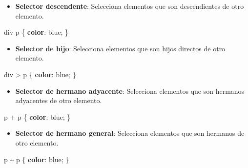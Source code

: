 \documentclass[
  a4paper,
  DIV=11,
  numbers=noendperiod,
  onepage,
  openany]{scrreprt}
\newenvironment{Shaded}{\begin{snugshade}}{\end{snugshade}}
\newcommand{\CharTok}[1]{\textcolor[rgb]{0.13,0.47,0.30}{#1}}
\newcommand{\ConstantTok}[1]{\textcolor[rgb]{0.56,0.35,0.01}{#1}}
\newcommand{\KeywordTok}[1]{\textcolor[rgb]{0.00,0.23,0.31}{\textbf{#1}}}
\newcommand{\NormalTok}[1]{\textcolor[rgb]{0.00,0.23,0.31}{#1}}
\newcommand{\OperatorTok}[1]{\textcolor[rgb]{0.37,0.37,0.37}{#1}}
\providecommand{\tightlist}{%
  \setlength{\itemsep}{0pt}\setlength{\parskip}{0pt}}\usepackage{longtable,booktabs,array}
\begin{document}
\begin{tcolorbox}
\begin{itemize}
\tightlist
\item
  \textbf{Selector descendente}: Selecciona elementos que son
  descendientes de otro elemento.
\end{itemize}

\begin{Shaded}
\begin{Highlighting}[]
\NormalTok{div p \{}
  \KeywordTok{color}\CharTok{:} \ConstantTok{blue}\OperatorTok{;}
\NormalTok{\}}
\end{Highlighting}
\end{Shaded}

\begin{itemize}
\tightlist
\item
  \textbf{Selector de hijo}: Selecciona elementos que son hijos directos
  de otro elemento.
\end{itemize}

\begin{Shaded}
\begin{Highlighting}[]
\NormalTok{div }\OperatorTok{\textgreater{}}\NormalTok{ p \{}
  \KeywordTok{color}\CharTok{:} \ConstantTok{blue}\OperatorTok{;}
\NormalTok{\}}
\end{Highlighting}
\end{Shaded}

\begin{itemize}
\tightlist
\item
  \textbf{Selector de hermano adyacente}: Selecciona elementos que son
  hermanos adyacentes de otro elemento.
\end{itemize}

\begin{Shaded}
\begin{Highlighting}[]
\NormalTok{p }\OperatorTok{+}\NormalTok{ p \{}
  \KeywordTok{color}\CharTok{:} \ConstantTok{blue}\OperatorTok{;}
\NormalTok{\}}
\end{Highlighting}
\end{Shaded}

\begin{itemize}
\tightlist
\item
  \textbf{Selector de hermano general}: Selecciona elementos que son
  hermanos de otro elemento.
\end{itemize}

\begin{Shaded}
\begin{Highlighting}[]
\NormalTok{p }\OperatorTok{\textasciitilde{}}\NormalTok{ p \{}
  \KeywordTok{color}\CharTok{:} \ConstantTok{blue}\OperatorTok{;}
\NormalTok{\}}
\end{Highlighting}
\end{Shaded}


\end{tcolorbox}
\end{document}
